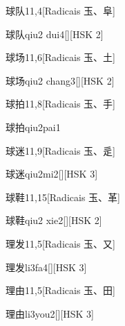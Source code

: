 \begin{entry}{球队}{11,4}[Radicais ⽟、⾩]
  \begin{phonetics}{球队}{qiu2 dui4}[][HSK 2]
  \end{phonetics}
\end{entry}

\begin{entry}{球场}{11,6}[Radicais ⽟、⼟]
  \begin{phonetics}{球场}{qiu2 chang3}[][HSK 2]
  \end{phonetics}
\end{entry}

\begin{entry}{球拍}{11,8}[Radicais ⽟、⼿]
  \begin{phonetics}{球拍}{qiu2pai1}
  \end{phonetics}
\end{entry}

\begin{entry}{球迷}{11,9}[Radicais ⽟、⾡]
  \begin{phonetics}{球迷}{qiu2mi2}[][HSK 3]
  \end{phonetics}
\end{entry}

\begin{entry}{球鞋}{11,15}[Radicais ⽟、⾰]
  \begin{phonetics}{球鞋}{qiu2 xie2}[][HSK 2]
  \end{phonetics}
\end{entry}

\begin{entry}{理发}{11,5}[Radicais ⽟、⼜]
  \begin{phonetics}{理发}{li3fa4}[][HSK 3]
  \end{phonetics}
\end{entry}

\begin{entry}{理由}{11,5}[Radicais ⽟、⽥]
  \begin{phonetics}{理由}{li3you2}[][HSK 3]
  \end{phonetics}
\end{entry}


